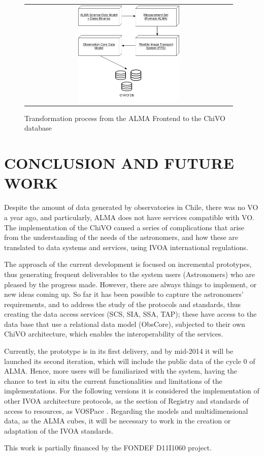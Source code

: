 \documentclass[]{spie}
\begin{document}
\begin{figure}
   \begin{center}
   \begin{tabular}{c}
   \includegraphics[width=0.5\textwidth]{images/metadata.png}
   \end{tabular}
   \end{center}
   \caption[example]
   { \label{fig:metadata} Transformation process from the ALMA Frontend to the ChiVO database}
\end{figure}

\section{CONCLUSION AND FUTURE WORK}
Despite the amount of data generated by observatories in Chile, there was no VO a year ago, and particularly, ALMA does not have services compatible with VO. The implementation of the ChiVO caused a series of complications that arise from the understanding of the needs of the astronomers, and how these are translated to data systems and services, using IVOA international regulations.

The approach of the current development is focused on incremental prototypes, thus generating frequent deliverables to the system users (Astronomers) who are pleased by the progress made. However, there are always things to implement, or new ideas coming up. So far it has been possible to capture the astronomers' requirements, and to address the study of the protocols and standards, thus creating the data access services (SCS, SIA, SSA, TAP); these have access to the data base that use a relational data model (ObsCore), subjected to their own ChiVO architecture, which enables the interoperability of the services.

Currently, the prototype is in its first delivery, and by mid-2014 it will be launched its second iteration, which will include the public data of the cycle 0 of ALMA. Hence, more users will be familiarized with the system, having the chance to test in situ the current functionalities and limitations of the implementations.  For the following versions it is considered the implementation of other IVOA architecture protocols, as the section of Registry and standards of access to resources, as VOSPace \cite{graham2007vospace}.  Regarding the models and multidimensional data, as the ALMA cubes, it will be necessary to work in the creation or adaptation of the IVOA standards.


\acknowledgments     %
This work is partially financed by the FONDEF D11I1060 project.

\end{document}
